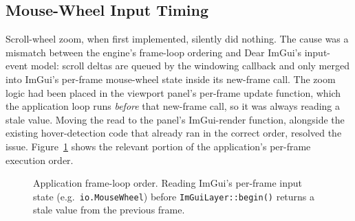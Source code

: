 \documentclass[conference]{IEEEtran}
\begin{document}
\subsection{Mouse-Wheel Input Timing}
Scroll-wheel zoom, when first implemented, silently did nothing. The
cause was a mismatch between the engine's frame-loop ordering and Dear
ImGui's input-event model: scroll deltas are queued by the windowing
callback and only merged into ImGui's per-frame mouse-wheel state inside
its new-frame call. The zoom logic had been placed in the viewport
panel's per-frame update function, which the application loop runs
\emph{before} that new-frame call, so it was always reading a stale
value. Moving the read to the panel's ImGui-render function, alongside
the existing hover-detection code that already ran in the correct order,
resolved the issue. Figure~\ref{fig:frame-loop} shows the relevant
portion of the application's per-frame execution order.

\begin{figure}[htbp]
\centering
{}
\caption{Application frame-loop order. Reading ImGui's per-frame input
state (e.g.\ \texttt{io.MouseWheel}) before \texttt{ImGuiLayer::begin()}
returns a stale value from the previous frame.}
\label{fig:frame-loop}
\end{figure}
\end{document}
